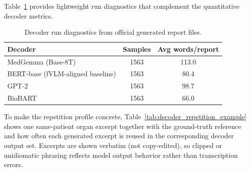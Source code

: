 Table~\ref{tab:decoder_sanity} provides lightweight run diagnostics that complement the quantitative decoder metrics.

\begin{table}[htbp]
    \centering
    \caption{Decoder run diagnostics from official generated report files.}
    \label{tab:decoder_sanity}
    \begin{tabular}{lcc}
        \toprule
        \textbf{Decoder} & \textbf{Samples} & \textbf{Avg words/report} \\\midrule
        MedGemma (Base-8T) & 1563 & 113.0 \\
        BERT-base (fVLM-aligned baseline) & 1563 & 80.4 \\
        GPT-2 & 1563 & 98.7 \\
        BioBART & 1563 & 66.0 \\
        \bottomrule
    \end{tabular}
\end{table}

\begin{table}[htbp]
    \centering
    \caption{Decoder diversity diagnostics from normalized generated reports.}
    \label{tab:decoder_diversity}
\end{table}

To make the repetition profile concrete, Table~\ref{tab:decoder_repetition_example} shows one same-patient organ excerpt together with the ground-truth reference and how often each generated excerpt is reused in the corresponding decoder output set. Excerpts are shown verbatim (not copy-edited), so clipped or unidiomatic phrasing reflects model output behavior rather than transcription errors.

